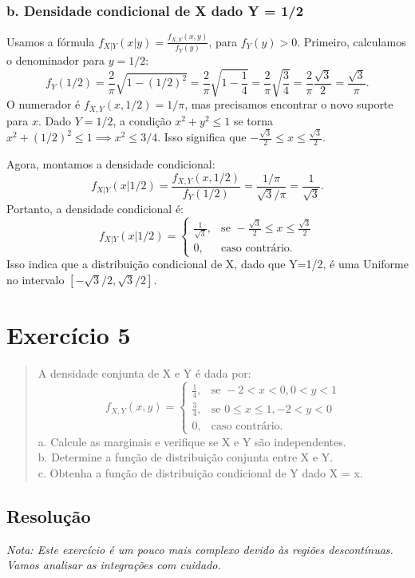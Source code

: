 \documentclass[12pt]{article}
\begin{document}
\subsubsection*{b. Densidade condicional de X dado Y = 1/2}
Usamos a fórmula $f_{X|Y}(x|y) = \frac{f_{X,Y}(x,y)}{f_Y(y)}$, para $f_Y(y)>0$.
Primeiro, calculamos o denominador para $y=1/2$:
\[ f_Y(1/2) = \frac{2}{\pi}\sqrt{1-(1/2)^2} = \frac{2}{\pi}\sqrt{1-\frac{1}{4}} = \frac{2}{\pi}\sqrt{\frac{3}{4}} = \frac{2}{\pi}\frac{\sqrt{3}}{2} = \frac{\sqrt{3}}{\pi}. \]
O numerador é $f_{X,Y}(x, 1/2) = 1/\pi$, mas precisamos encontrar o novo suporte para $x$.
Dado $Y=1/2$, a condição $x^2+y^2 \le 1$ se torna $x^2 + (1/2)^2 \le 1 \implies x^2 \le 3/4$.
Isso significa que $-\frac{\sqrt{3}}{2} \le x \le \frac{\sqrt{3}}{2}$.

Agora, montamos a densidade condicional:
\[ f_{X|Y}(x | 1/2) = \frac{f_{X,Y}(x, 1/2)}{f_Y(1/2)} = \frac{1/\pi}{\sqrt{3}/\pi} = \frac{1}{\sqrt{3}}. \]
Portanto, a densidade condicional é:
\[ f_{X|Y}(x | 1/2) = \begin{cases} \frac{1}{\sqrt{3}}, & \text{se } -\frac{\sqrt{3}}{2} \le x \le \frac{\sqrt{3}}{2} \\ 0, & \text{caso contrário.} \end{cases} \]
Isso indica que a distribuição condicional de X, dado que Y=1/2, é uma Uniforme no intervalo $[-\sqrt{3}/2, \sqrt{3}/2]$.

\pagebreak

\section{Exercício 5}

\begin{quote}
A densidade conjunta de X e Y é dada por:
\[ f_{X,Y}(x,y) = \begin{cases} \frac{1}{4}, & \text{se } -2 < x < 0, 0 < y < 1 \\ \frac{3}{4}, & \text{se } 0 \le x \le 1, -2 < y < 0 \\ 0, & \text{caso contrário.} \end{cases} \]
a. Calcule as marginais e verifique se X e Y são independentes. \\
b. Determine a função de distribuição conjunta entre X e Y. \\
c. Obtenha a função de distribuição condicional de Y dado X = x.
\end{quote}

\subsection*{Resolução}
\textit{Nota: Este exercício é um pouco mais complexo devido às regiões descontínuas. Vamos analisar as integrações com cuidado.}
\end{document}
